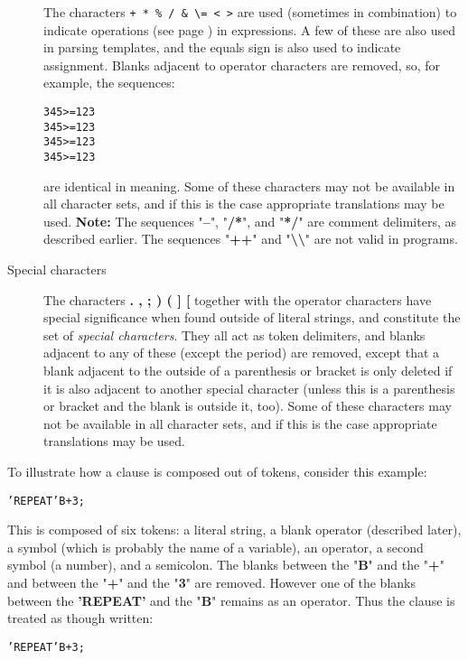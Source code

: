 \begin{description}
The characters \texttt{+ \textendash \-  * \% \textbar / \& \textbackslash = < >}
are used (sometimes in combination) to indicate
 operations (see page \pageref{refops})  in expressions.
A few of these are also used in parsing templates, and the equals sign
is also used to indicate assignment.
Blanks adjacent to operator characters are removed, so, for example,
the sequences:
\begin{alltt}
345>=123
345 >=123
345 >=  123
345 > =  123
\end{alltt}
are identical in meaning.
 Some of these characters may not be available in all character sets,
and if this is the case appropriate translations may be used.
\textbf{Note: }The sequences "\textbf{--}", "\textbf{/*}", and
"\textbf{*/}" are comment delimiters, as described earlier.
The sequences "\textbf{++}"
and "\textbf{\textbackslash \textbackslash }" are not valid in \nr{}
programs.
\item[Special characters]\label{refspecs}

The characters  \textbf{.  ,  ;  )  (  ]  [}  together
with the operator characters have special significance when found
outside of literal strings, and constitute the set of \emph{special
characters}.
They all act as token delimiters, and blanks adjacent to any of these
(except the period) are removed, except that a blank adjacent to the
outside of a parenthesis or bracket is only deleted if it is also
adjacent to another special character (unless this is a parenthesis or
bracket and the blank is outside it, too).
 Some of these characters may not be available in all character sets,
and if this is the case appropriate translations may be used.
\end{description}
 To illustrate how a clause is composed out of tokens, consider this
example:
\begin{alltt}
'REPEAT'   B + 3;
\end{alltt}
This is composed of six tokens: a literal string, a blank operator
(described later), a symbol (which is probably the name of a variable),
an operator, a second symbol (a number), and a semicolon.
The blanks between the "\textbf{B}" and the "\textbf{+}"
and between the "\textbf{+}" and the "\textbf{3}" are
removed.
However one of the blanks between the \textbf{'REPEAT'} and the
"\textbf{B}" remains as an operator.
Thus the clause is treated as though written:
\begin{alltt}
'REPEAT' B+3;
\end{alltt}
